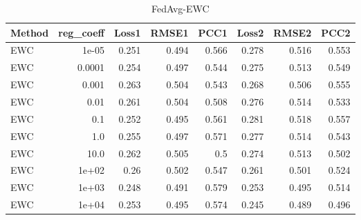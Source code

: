 \begin{table}
\caption{FedAvg-EWC}
\begin{tabular}{lrrrrrrr}
\toprule
Method & reg_coeff & Loss1 & RMSE1 & PCC1 & Loss2 & RMSE2 & PCC2 \\
\midrule
EWC & 1e-05 & 0.251 & 0.494 & 0.566 & 0.278 & 0.516 & 0.553 \\
EWC & 0.0001 & 0.254 & 0.497 & 0.544 & 0.275 & 0.513 & 0.549 \\
EWC & 0.001 & 0.263 & 0.504 & 0.543 & 0.268 & 0.506 & 0.555 \\
EWC & 0.01 & 0.261 & 0.504 & 0.508 & 0.276 & 0.514 & 0.533 \\
EWC & 0.1 & 0.252 & 0.495 & 0.561 & 0.281 & 0.518 & 0.557 \\
EWC & 1.0 & 0.255 & 0.497 & 0.571 & 0.277 & 0.514 & 0.543 \\
EWC & 10.0 & 0.262 & 0.505 & 0.5 & 0.274 & 0.513 & 0.502 \\
EWC & 1e+02 & 0.26 & 0.502 & 0.547 & 0.261 & 0.501 & 0.524 \\
EWC & 1e+03 & 0.248 & 0.491 & 0.579 & 0.253 & 0.495 & 0.514 \\
EWC & 1e+04 & 0.253 & 0.495 & 0.574 & 0.245 & 0.489 & 0.496 \\
\bottomrule
\end{tabular}
\end{table}

